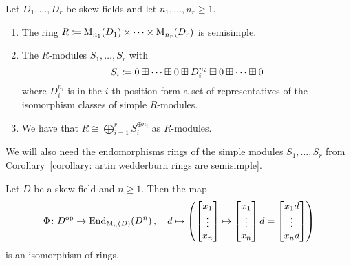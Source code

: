 \begin{corollary}
  \label{corollary: artin wedderburn rings are semisimple}
  Let $D_1, \dotsc, D_r$ be skew fields and let $n_1, \dotsc, n_r \geq 1$.
  \begin{enumerate}
    \item
      The ring $R \coloneqq  \operatorname{M}_{n_1}(D_1) \times \dotsb \times  \operatorname{M}_{n_r}(D_r)$ is semisimple.
    \item
      The $R$-modules $S_1, \dotsc, S_r$ with
      \[
                  S_i
        \coloneqq  0 \boxplus \dotsb \boxplus 0 \boxplus D_i^{n_i} \boxplus 0 \boxplus \dotsb \boxplus 0
      \]
      where $D_i^{n_i}$ is in the $i$-th position form a set of representatives of the isomorphism classes of simple $R$-modules.
    \item
      We have that $R \cong \bigoplus_{i=1}^r S_i^{\oplus n_i}$ as $R$-modules.
  \end{enumerate}
\end{corollary}


\begin{fluff}
  We will also need the endomorphisms rings of the simple modules $S_1, \dotsc, S_r$ from Corollary~\ref{corollary: artin wedderburn rings are semisimple}.
\end{fluff}


\begin{lemma}
  \label{lemma: matrix vector space correspondence for skew fields}
  Let $D$ be a skew-field and $n \geq 1$.
  Then the map
  \[
            \Phi 
    \colon  D^{\mathrm{op}}
    \to     \operatorname{End}_{\operatorname{M}_n(D)}(D^n) \,,
    \quad   d
    \mapsto \left(
                      \begin{bmatrix}x_1 \\ \vdots \\ x_n\end{bmatrix}
              \mapsto \begin{bmatrix}x_1 \\ \vdots \\ x_n\end{bmatrix} d
              =       \begin{bmatrix}x_1 d \\ \vdots \\ x_n d\end{bmatrix}
            \right)
  \]
  is an isomorphism of rings.
\end{lemma}


